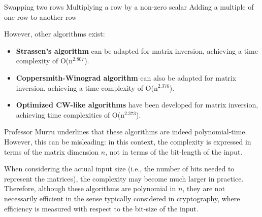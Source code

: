 \begin{algorithm}
\caption{Gauss-Jordan}
\begin{algorithmic}[1]

\State Swapping two rows
\State Multiplying a row by a non-zero scalar
\State Adding a multiple of one row to another row

\end{algorithmic}

\end{algorithm}

\noindent
However, other algorithms exist:
\begin{itemize}
    \item \textbf{Strassen's algorithm} can be adapted for matrix inversion, achieving a time complexity of O(n$^{2.807}$).\\
    \item \textbf{Coppersmith-Winograd algorithm} can also be adapted for matrix inversion, achieving a time complexity of O(n$^{2.376}$).\\
    \item \textbf{Optimized CW-like algorithms} have been developed for matrix inversion, achieving time complexities of O(n$^{2.373}$).

\end{itemize}
\bigskip

\noindent
Professor Murru underlines that these algorithms are indeed polynomial-time. However, this can be misleading: in this context, the complexity is expressed in terms of the matrix dimension $n$, not in terms of the bit-length of the input. 
\medskip

\noindent
When considering the actual input size (i.e., the number of bits needed to represent the matrices), the complexity may become much larger in practice. Therefore, although these algorithms are polynomial in $n$, they are not necessarily efficient in the sense typically considered in cryptography, where efficiency is measured with respect to the bit-size of the input.

